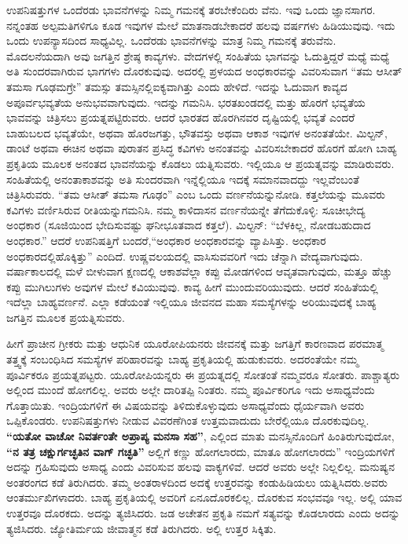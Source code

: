 ಉಪನಿಷತ್ತುಗಳ ಒಂದೆರಡು ಭಾವನೆಗಳನ್ನು ನಿಮ್ಮ ಗಮನಕ್ಕೆ ತರಬೇಕೆಂದಿರು ವೆನು. ಇವು ಒಂದು ಜ್ಞಾನಸಾಗರ. ನನ್ನಂತಹ ಅಲ್ಪಮತಿಗಳಿಗೂ ಕೂಡ ಇವುಗಳ ಮೇಲೆ ಮಾತನಾಡಬೇಕಾದರೆ ಹಲವು ವರ್ಷಗಳು ಹಿಡಿಯುವುವು. ಇದು ಒಂದು ಉಪನ್ಯಾಸದಿಂದ ಸಾಧ್ಯವಿಲ್ಲ. ಒಂದೆರಡು ಭಾವನೆಗಳನ್ನು ಮಾತ್ರ ನಿಮ್ಮ ಗಮನಕ್ಕೆ ತರುವೆನು. ಮೊದಲನೆಯದಾಗಿ ಅವು ಜಗತ್ತಿನ ಶ್ರೇಷ್ಠ ಕಾವ್ಯಗಳು. ವೇದಗಳಲ್ಲಿ ಸಂಹಿತೆಯ ಭಾಗವನ್ನು ಓದುತ್ತಿದ್ದರೆ ಮಧ್ಯೆ ಮಧ್ಯೆ ಅತಿ ಸುಂದರವಾಗಿರುವ ಭಾಗಗಳು ದೊರಕುವುವು. ಅದರಲ್ಲಿ ಪ್ರಳಯದ ಅಂಧಕಾರವನ್ನು ವಿವರಿಸುವಾಗ “ತಮ ಆಸೀತ್​ ತಮಸಾ ಗೂಢಮಗ್ರೇ” ತಮಸ್ಸು ತಮಸ್ಸಿನಲ್ಲಿ\break ಐಕ್ಯವಾಗಿತ್ತು ಎಂದು ಹೇಳಿದೆ. ಇದನ್ನು ಓದುವಾಗ ಕಾವ್ಯದ ಅಪೂರ್ವ\break ಭವ್ಯತೆಯ ಅನುಭವವಾಗುವುದು. ಇದನ್ನು ಗಮನಿಸಿ. ಭರತಖಂಡದಲ್ಲಿ ಮತ್ತು ಹೊರಗೆ ಭವ್ಯತೆಯ ಭಾವವನ್ನು ಚಿತ್ರಿಸಲು ಪ್ರಯತ್ನಪಟ್ಟಿರುವರು. ಆದರೆ ಭಾರತದ ಹೊರಗಿನವರ ದೃಷ್ಟಿಯಲ್ಲಿ ಭವ್ಯತೆ ಎಂದರೆ ಬಾಹುಬಲದ ಭವ್ಯತೆಯೇ, ಅಥವಾ ಹೊರಜಗತ್ತು, ಭೌತವಸ್ತು ಅಥವಾ ಆಕಾಶ ಇವುಗಳ ಅನಂತತೆಯೇ. ಮಿಲ್ಟನ್​, ಡಾಂಟೆ ಅಥವಾ ಈಚಿನ ಅಥವಾ ಪುರಾತನ ಪ್ರಸಿದ್ಧ ಕವಿಗಳು ಅನಂತವನ್ನು ವಿವರಿಸಬೇಕಾದರೆ ಹೊರಗೆ ಹೋಗಿ ಬಾಹ್ಯ ಪ್ರಕೃತಿಯ ಮೂಲಕ ಅನಂತದ ಭಾವನೆಯನ್ನು ಕೊಡಲು ಯತ್ನಿಸುವರು. ಇಲ್ಲಿಯೂ ಆ ಪ್ರಯತ್ನವನ್ನು ಮಾಡಿರುವರು. ಸಂಹಿತೆಯಲ್ಲಿ ಅನಂತಾಕಾಶವನ್ನು ಅತಿ ಸುಂದರವಾಗಿ ಇನ್ನೆಲ್ಲಿಯೂ ಇದಕ್ಕೆ ಸಮಾನವಾದದ್ದು ಇಲ್ಲವೆಂಬಂತೆ ಚಿತ್ರಿಸಿರುವರು. “ತಮ ಆಸೀತ್​ ತಮಸಾ ಗೂಢಂ” ಎಂಬ ಒಂದು ವರ್ಣನೆಯನ್ನು\break ನೋಡಿ. ಕತ್ತಲೆಯನ್ನು ಮೂವರು ಕವಿಗಳು ವರ್ಣಿಸಿರುವ ರೀತಿಯನ್ನು\break ಗಮನಿಸಿ. ನಮ್ಮ ಕಾಳಿದಾಸನ ವರ್ಣನೆಯನ್ನೇ ತೆಗೆದುಕೊಳ್ಳಿ: ಸೂಚೀಭೇದ್ಯ ಅಂಧಕಾರ (ಸೂಜಿಯಿಂದ ಭೇದಿಸುವಷ್ಟು ಘನೀಭೂತವಾದ ಕತ್ತಲೆ). ಮಿಲ್ಟನ್​: “ಬೆಳಕಿಲ್ಲ, ನೋಡಬಹುದಾದ ಅಂಧಕಾರ.” ಆದರೆ ಉಪನಿಷತ್ತಿಗೆ ಬಂದರೆ,\break “ಅಂಧಕಾರ ಅಂಧಕಾರವನ್ನು ವ್ಯಾಪಿಸಿತ್ತು. ಅಂಧಕಾರ ಅಂಧಕಾರದಲ್ಲಿ\break ಹೊಕ್ಕಿತ್ತು” ಎಂದಿದೆ. ಉಷ್ಣವಲಯದಲ್ಲಿ ವಾಸಿಸುವವರಿಗೆ ಇದು ಚೆನ್ನಾಗಿ ವೇದ್ಯವಾಗುವುದು. ವರ್ಷಾಕಾಲದಲ್ಲಿ ಮಳೆ ಬೀಳುವಾಗ ಕ್ಷಣದಲ್ಲಿ ಆಕಾಶವೆಲ್ಲಾ ಕಪ್ಪು ಮೋಡಗಳಿಂದ ಆವೃತವಾಗುವುದು, ಮತ್ತೂ ಹೆಚ್ಚು ಕಪ್ಪು ಮುಗಿಲುಗಳು ಅವುಗಳ ಮೇಲೆ ಕವಿಯುವುವು. ಕಾವ್ಯ ಹೀಗೆ ಮುಂದುವರಿಯುವುದು. ಆದರೆ ಸಂಹಿತೆಯಲ್ಲಿ ಇದೆಲ್ಲಾ ಬಾಹ್ಯವರ್ಣನೆ. ಎಲ್ಲಾ ಕಡೆಯಂತೆ ಇಲ್ಲಿಯೂ ಜೀವನದ ಮಹಾ ಸಮಸ್ಯೆಗಳನ್ನು ಅರಿಯುವುದಕ್ಕೆ ಬಾಹ್ಯ ಜಗತ್ತಿನ ಮೂಲಕ ಪ್ರಯತ್ನಿಸುವರು.

ಹೀಗೆ ಪ್ರಾಚೀನ ಗ್ರೀಕರು ಮತ್ತು ಆಧುನಿಕ ಯೂರೋಪಿಯನರು ಜೀವನಕ್ಕೆ ಮತ್ತು ಜಗತ್ತಿಗೆ ಕಾರಣವಾದ ಪರಮಾತ್ಮ ತತ್ತ್ವಕ್ಕೆ ಸಂಬಂಧಿಸಿದ ಸಮಸ್ಯೆಗಳ ಪರಿಹಾರವನ್ನು ಬಾಹ್ಯ ಪ್ರಕೃತಿಯಲ್ಲಿ ಹುಡುಕುವರು. ಅದರಂತೆಯೇ ನಮ್ಮ ಪೂರ್ವಿಕರೂ ಪ್ರಯತ್ನಪಟ್ಟರು. ಯೂರೋಪಿಯನ್ನರು ಈ ಪ್ರಯತ್ನದಲ್ಲಿ ಸೋತಂತೆ ನಮ್ಮವರೂ ಸೋತರು. ಪಾಶ್ಚಾತ್ಯರು ಅಲ್ಲಿಂದ ಮುಂದೆ ಹೋಗಲಿಲ್ಲ. ಅವರು ಅಲ್ಲೇ ದಾರಿತಪ್ಪಿ ನಿಂತರು. ನಮ್ಮ ಪೂರ್ವಿಕರಿಗೂ ಇದು ಅಸಾಧ್ಯವೆಂದು ಗೊತ್ತಾಯಿತು. ಇಂದ್ರಿಯಗಳಿಗೆ ಈ ವಿಷಯವನ್ನು ತಿಳಿದುಕೊಳ್ಳುವುದು ಅಸಾಧ್ಯವೆಂದು ಧೈರ್ಯವಾಗಿ ಅವರು ಒಪ್ಪಿಕೊಂಡರು. ಉಪನಿಷತ್ತುಗಳು ನೀಡುವ ವಿವರಣೆಗಿಂತ ಉತ್ತಮವಾದುದು ಬೇರೆಲ್ಲಿಯೂ ದೊರಕುವುದಿಲ್ಲ. \textbf{“ಯತೋ ವಾಚೋ ನಿವರ್ತಂತೇ ಅಪ್ರಾಪ್ಯ ಮನಸಾ ಸಹ”}, ಎಲ್ಲಿಂದ ಮಾತು ಮನಸ್ಸಿನೊಂದಿಗೆ ಹಿಂತಿರುಗುವುದೋ, \textbf{“ನ ತತ್ರ ಚಕ್ಷುರ್ಗಚ್ಛತಿನ ವಾಗ್​ ಗಚ್ಛತಿ”} ಅಲ್ಲಿಗೆ ಕಣ್ಣು ಹೋಗಲಾರದು, ಮಾತೂ ಹೋಗಲಾರದು” ಇಂದ್ರಿಯಗಳಿಗೆ ಅದನ್ನು ಗ್ರಹಿಸುವುದು ಅಸಾಧ್ಯ ಎಂದು ವಿವರಿಸುವ ಹಲವು ವಾಕ್ಯಗಳಿವೆ. ಆದರೆ ಅವರು ಅಲ್ಲೇ ನಿಲ್ಲಲಿಲ್ಲ. ಮನುಷ್ಯನ ಅಂತರಂಗದ ಕಡೆ ತಿರುಗಿದರು. ತಮ್ಮ ಅಂತರಾಳದಿಂದ ಅದಕ್ಕೆ ಉತ್ತರವನ್ನು ಕಂಡುಹಿಡಿಯಲು ಯತ್ನಿಸಿದರು.\break ಅವರು ಆಂತರ್ಮುಖಿಗಳಾದರು. ಬಾಹ್ಯ ಪ್ರಕೃತಿಯಲ್ಲಿ ಅವರಿಗೆ ಏನೂ\break ದೊರಕಲಿಲ್ಲ. ದೊರಕುವ ಸಂಭವವೂ ಇಲ್ಲ. ಅಲ್ಲಿ ಯಾವ ಉತ್ತರವೂ ದೊರಕದು. ಅದನ್ನು ತ್ಯಜಿಸಿದರು. ಜಡ ಅಚೇತನ ಪ್ರಕೃತಿ ನಮಗೆ ಸತ್ಯವನ್ನು ಕೊಡಲಾರದು ಎಂದು ಅದನ್ನು ತ್ಯಜಿಸಿದರು. ಜ್ಯೋತಿರ್ಮಯ ಜೀವಾತ್ಮನ ಕಡೆ ತಿರುಗಿದರು. ಅಲ್ಲಿ ಉತ್ತರ ಸಿಕ್ಕಿತು.

